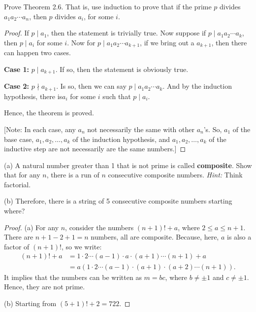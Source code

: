 \documentclass[12pt]{article}
\newenvironment{exercise}[2][Exercise]{\begin{trivlist}
\item[\hskip \labelsep {\bfseries #1}\hskip \labelsep {\bfseries #2.}]}{\end{trivlist}}
\begin{document}
\begin{exercise}{5}
	Prove Theorem 2.6. That is, use induction to prove that if the prime \(p\) divides \(a_1 a_2 \cdots a_n\), then \(p\) divides \(a_i\), for some \(i\).
\end{exercise}

\begin{proof}
	If $p\mid a_1$, then the statement is trivially true. Now suppose if $p\mid a_1 a_2 \cdots a_k$, then $p\mid a_i$ for some $i$. Now for $p\mid a_1 a_2 \cdots a_{k+1}$, if we bring out a $a_{k+1}$, then there can happen two cases.

	\textbf{Case 1:} $p\mid a_{k+1}$. If so, then the statement is obviously true.

	\textbf{Case 2:} $p\nmid a_{k+1}$. Is so, then we can say $p\mid a_1 a_2 \cdots a_k$. And by the induction hypothesis, there is$a_i$ for some $i$ such that $p\mid a_i$.

	Hence, the theorem is proved.

		[Note: In each case, any $a_n$ not necessarily the same with other $a_n$'s. So, $a_1$ of the base case, $a_1, a_2, \ldots ,a_k$ of the induction hypothesis, and $a_1, a_2, \ldots ,a_k$ of the inductive step are not necessarily are the same numbers.]
\end{proof}

\begin{exercise}{7}
	(a) A natural number greater than 1 that is not prime is called \textbf{composite}. Show that for any \( n \), there is a run of \( n \) consecutive composite numbers. \textit{Hint:} Think factorial.

	(b) Therefore, there is a string of 5 consecutive composite numbers starting where?
\end{exercise}

\begin{proof}
	(a) For any $n$, consider the numbers $(n+1)!+a$, where $2\leq a \leq n+1$. There are $n+1-2+1=n$ numbers, all are composite. Because, here, $a$ is also a factor of $(n+1)!$, so we write:
	\begin{align*}
		(n+1)!+a & = 1\cdot 2\cdots (a-1)\cdot a\cdot (a+1) \cdots (n+1) + a     \\
		         & = a(1\cdot 2\cdots (a-1) \cdot (a+1)\cdot (a+2)\cdots (n+1)).
	\end{align*}
	It implies that the numbers can be written as $m=bc$, where $b\neq \pm 1$ and $c\neq \pm 1$. Hence, they are not prime.

	(b) Starting from $(5+1)!+2=722$.
\end{proof}
\end{document}
